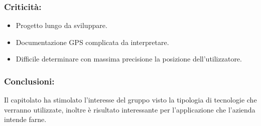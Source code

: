 	\subsubsection{Criticità:}
		\begin{itemize}
			\item Progetto lungo da sviluppare.
			\item Documentazione GPS complicata da interpretare.
			\item Difficile determinare con massima precisione la posizione dell'utilizzatore.
		\end{itemize}
	
	\subsubsection{Conclusioni:}
		Il capitolato ha stimolato l'interesse del gruppo visto la tipologia di tecnologie che verranno utilizzate, inoltre è risultato interessante per l'applicazione che l'azienda intende farne.